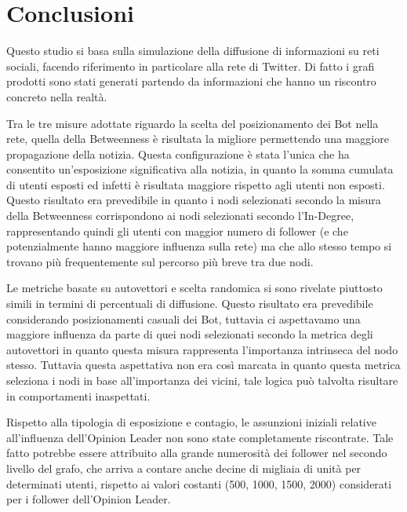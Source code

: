 \section{Conclusioni}
    Questo studio si basa sulla simulazione della diffusione di informazioni su reti sociali, facendo riferimento in particolare alla rete di Twitter. Di fatto i grafi prodotti sono stati generati partendo da informazioni che hanno un riscontro concreto nella realtà.
    
    \hspace{15pt}
    Tra le tre misure adottate riguardo la scelta del posizionamento dei Bot nella rete, quella della Betweenness è risultata la migliore permettendo una maggiore propagazione della notizia. Questa configurazione è stata l'unica che ha consentito un'esposizione significativa alla notizia, in quanto la somma cumulata di utenti esposti ed infetti è risultata maggiore rispetto agli utenti non esposti. Questo risultato era prevedibile in quanto i nodi selezionati secondo la misura della Betweenness corrispondono ai nodi selezionati secondo l'In-Degree, rappresentando quindi gli utenti con maggior numero di follower (e che potenzialmente hanno maggiore influenza sulla rete) ma che allo stesso tempo si trovano più frequentemente sul percorso più breve tra due nodi.
    
    \hspace{15pt}
    Le metriche basate su autovettori e scelta randomica si sono rivelate piuttosto simili in termini di percentuali di diffusione. Questo risultato era prevedibile considerando posizionamenti casuali dei Bot, tuttavia ci aspettavamo una maggiore influenza da parte di quei nodi selezionati secondo la metrica degli autovettori in quanto questa misura rappresenta l'importanza intrinseca del nodo stesso.
    Tuttavia questa aspettativa non era così marcata in quanto questa metrica seleziona i nodi in base all'importanza dei vicini, tale logica può talvolta risultare in comportamenti inaspettati.

    \hspace{15pt}
    Rispetto alla tipologia di esposizione e contagio, le assunzioni iniziali relative all'influenza dell'Opinion Leader non sono state completamente riscontrate. Tale fatto potrebbe essere attribuito alla grande numerosità dei follower nel secondo livello del grafo, che arriva a contare anche decine di migliaia di unità per determinati utenti, rispetto ai valori costanti (500, 1000, 1500, 2000) considerati per i follower dell'Opinion Leader.
    

